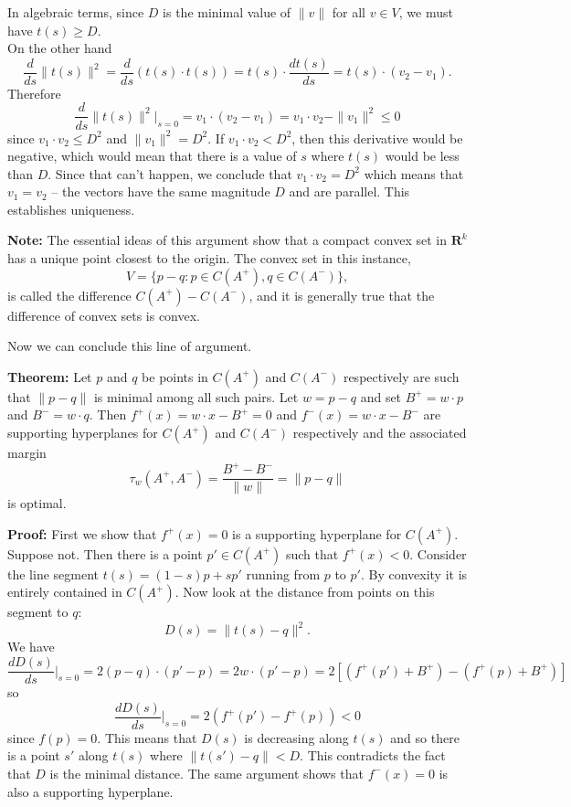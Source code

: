 \documentclass[
  11pt,
  letterpaper,
]{scrbook}
\theoremstyle{plain}
\theoremstyle{plain}
\theoremstyle{remark}
\begin{document}
In algebraic terms, since \(D\) is the minimal value of \(\|v\|\) for
all \(v\in V\), we must have \(t(s)\ge D\).\\
On the other hand \[
\frac{d}{ds}\|t(s)\|^2 = \frac{d}{ds}(t(s)\cdot t(s)) =t(s)\cdot \frac{dt(s)}{ds} = t(s)\cdot(v_2-v_1).
\] Therefore \[
\frac{d}{ds}\|t(s)\|^2|_{s=0} = v_{1}\cdot(v_{2}-v_{1})=v_{1}\cdot v_{2}-\|v_{1}\|^2\le 0
\] since \(v_{1}\cdot v_{2}\le D^{2}\) and \(\|v_{1}\|^2=D^2\). If
\(v_{1}\cdot v_{2}<D^{2}\), then this derivative would be negative,
which would mean that there is a value of \(s\) where \(t(s)\) would be
less than \(D\). Since that can't happen, we conclude that
\(v_{1}\cdot v_{2}=D^{2}\) which means that \(v_{1}=v_{2}\) -- the
vectors have the same magnitude \(D\) and are parallel. This establishes
uniqueness.

\textbf{Note:} The essential ideas of this argument show that a compact
convex set in \(\mathbf{R}^{k}\) has a unique point closest to the
origin. The convex set in this instance, \[
V=\{p-q:p\in C(A^{+}),q\in C(A^{-})\},
\] is called the difference \(C(A^{+})-C(A^{-})\), and it is generally
true that the difference of convex sets is convex.

Now we can conclude this line of argument.

\textbf{Theorem:} Let \(p\) and \(q\) be points in \(C(A^{+})\) and
\(C(A^{-})\) respectively are such that \(\|p-q\|\) is minimal among all
such pairs. Let \(w=p-q\) and set \(B^{+}=w\cdot p\) and
\(B^{-}=w\cdot q\). Then \(f^{+}(x)=w\cdot x-B^{+}=0\) and
\(f^{-}(x)=w\cdot x-B^{-}\) are supporting hyperplanes for \(C(A^{+})\)
and \(C(A^{-})\) respectively and the associated margin \[
\tau_{w}(A^{+},A^{-})=\frac{B^{+}-B^{-}}{\|w\|} = \|p-q\|
\] is optimal.

\textbf{Proof:} First we show that \(f^{+}(x)=0\) is a supporting
hyperplane for \(C(A^{+})\). Suppose not. Then there is a point
\(p'\in C(A^{+})\) such that \(f^{+}(x)<0\). Consider the line segment
\(t(s) = (1-s)p+sp'\) running from \(p\) to \(p'\). By convexity it is
entirely contained in \(C(A^{+})\). Now look at the distance from points
on this segment to \(q\): \[
D(s)=\|t(s)-q\|^2.
\] We have \[
\frac{dD(s)}{ds}|_{s=0} = 2(p-q)\cdot (p'-p) = 2w\cdot (p'-p) = 2\left[(f^{+}(p')+B^{+})-(f^{+}(p)+B^{+})\right]
\] so \[
\frac{dD(s)}{ds}|_{s=0} = 2(f^{+}(p')-f^{+}(p))<0
\] since \(f(p)=0\). This means that \(D(s)\) is decreasing along
\(t(s)\) and so there is a point \(s'\) along \(t(s)\) where
\(\|t(s')-q\|<D\). This contradicts the fact that \(D\) is the minimal
distance. The same argument shows that \(f^{-}(x)=0\) is also a
supporting hyperplane.
\end{document}
